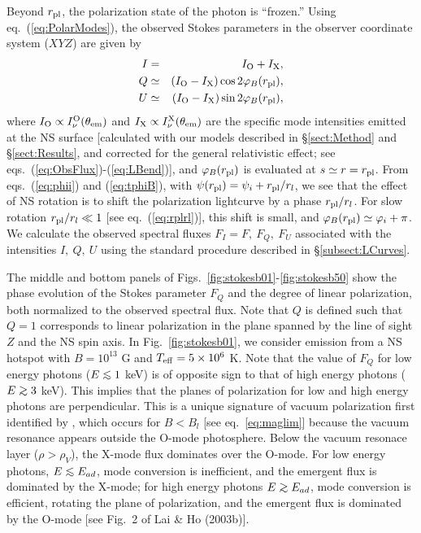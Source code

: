 \documentclass[useAMS,onecolumn,usenatbib,usegraphicx]{mn2e}
\def\go{\mathrel{\raise.3ex\hbox{$>$}\mkern-14mu\lower0.6ex\hbox{$\sim$}}}
\def\lo{\mathrel{\raise.3ex\hbox{$<$}\mkern-14mu\lower0.6ex\hbox{$\sim$}}}
\begin{document}
Beyond $r_{\rm pl}$, the polarization state of the photon is ``frozen.''
Using eq.~(\ref{eq:PolarModes}), the observed Stokes parameters 
in the observer coordinate system ($XYZ$) are given by
\begin{eqnarray}
\label{eq:AdStokes1}
I & = & I_{\rm O}+I_{\rm X},\\
\label{eq:AdStokes2}
Q & \simeq & (I_{\rm O}-I_{\rm X}) \cos 2\varphi_B(r_{\rm pl}),\\
\label{eq:AdStokes3}
U & \simeq & 
(I_{\rm O}-I_{\rm X})\sin 2\varphi_B(r_{\rm pl}),
\end{eqnarray}
where $I_{\rm O}\propto I_\nu^{\rm O}(\theta_{\rm em})$ and $I_{\rm X}\propto 
I_\nu^{\rm X}(\theta_{\rm em})$ are the specific mode intensities emitted at 
the NS surface [calculated with our models described in \S\ref{sect:Method} 
and \S\ref{sect:Results}, and corrected for the general relativistic
effect; see eqs.~(\ref{eq:ObsFlux})-(\ref{eq:LBend})], 
and $\varphi_B(r_{\rm pl})$ is evaluated at $s\simeq r=r_{\rm pl}$.  
From eqs.~(\ref{eq:phii}) and (\ref{eq:tphiB}), with $\psi(r_{\rm pl})
=\psi_i+r_{\rm pl}/r_l$, we see that the effect of NS rotation is to shift the
polarization lightcurve by a phase $r_{\rm pl}/r_l$. For slow rotation
$r_{\rm pl}/r_l\ll 1$ [see eq.~(\ref{eq:rplrl})], this shift is small, and
$\varphi_B(r_{\rm pl})\simeq \varphi_i+\pi$. We calculate the observed spectral
fluxes $F_I=F,~F_Q,~F_U$ associated with the intensities $I,~Q,~U$
using the standard procedure described in \S \ref{subsect:LCurves}.

The middle and bottom panels of
Figs.~\ref{fig:stokesb01}-\ref{fig:stokesb50} show the phase evolution
of the Stokes parameter $F_Q$ and the degree of linear polarization, 
both normalized to the observed spectral flux.  Note that 
$Q$ is defined such that $Q=1$ corresponds to linear
polarization in the plane spanned by the line of sight $Z$
and the NS spin axis.  In Fig.~\ref{fig:stokesb01}, we consider
emission from a NS hotspot with $B=10^{13}$ G and $T_{\rm eff}=5\times
10^6$ K.  Note that the value of $F_Q$ for low energy photons ($E \lo 1$
keV) is of opposite sign to that of high energy photons ($E \go 3$ keV).
This implies that the planes of polarization for low and high energy
photons are perpendicular.  This is a unique signature of vacuum
polarization first identified by \citet[][]{LaiHo03b}, which occurs
for $B<B_l$ [see eq.~\ref{eq:maglim}] because
the vacuum resonance appears outside the O-mode
photosphere. Below the vacuum resonace layer ($\rho>\rho_V$), the X-mode 
flux dominates over the O-mode. For low energy photons, $E\lo E_{ad}$, 
mode conversion is inefficient, and the emergent flux is dominated
by the X-mode; for high energy photons $E\go E_{ad}$, mode
conversion is efficient, rotating the plane of polarization, and 
the emergent flux is dominated by the O-mode [see Fig.~2 of Lai \& Ho (2003b)].
\end{document}
